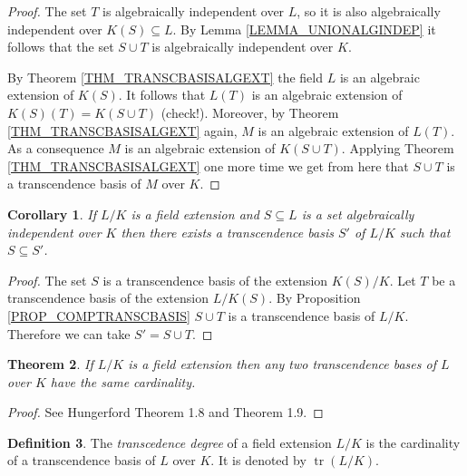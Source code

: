 \documentclass[12pt, letterpaper, oneside]{article}
\theoremstyle{plain}
\newtheorem{theorem}{Theorem}[section]
\newtheorem{corollary}[theorem]{Corollary}
\theoremstyle{definition}
\newtheorem{definition}[theorem]{Definition}
\newcommand{\tr}{\operatorname{tr}}
\newcommand{\vs}{\vskip 5mm}
\begin{document}
\vs

\begin{proof}
The set  $T$ is algebraically independent over $L$, so it is also algebraically independent 
over $K(S)\subseteq L$. By Lemma \ref{LEMMA_UNIONALGINDEP} it follows that 
the set $S\cup T$ is algebraically independent over $K$. 

By Theorem \ref{THM_TRANSCBASISALGEXT} the field $L$ is an algebraic 
extension of $K(S)$.  It follows that $L(T)$ is an algebraic extension of 
$K(S)(T) = K(S\cup T)$ (check!).  Moreover, by Theorem \ref{THM_TRANSCBASISALGEXT} 
again,  $M$ is an algebraic extension of $L(T)$. As a consequence 
$M$ is an algebraic extension of $K(S\cup T)$.  Applying Theorem 
\ref{THM_TRANSCBASISALGEXT} one more time we get from here that $S\cup T$
is a transcendence basis of $M$ over $K$. 
\end{proof}

\vs\vs


\begin{corollary}
If $L/K$ is a field extension and $S\subseteq L$ is a set algebraically independent over 
$K$ then there exists a transcendence basis $S'$ of $L/K$ such that $S\subseteq S'$.  
\end{corollary}

\begin{proof}
The set $S$ is a transcendence basis of the extension $K(S)/K$.  Let $T$ be a transcendence 
basis of the extension $L/K(S)$. By Proposition  \ref{PROP_COMPTRANSCBASIS} 
$S\cup T$ is a transcendence  basis of $L/K$. Therefore we can take $S'= S\cup T$. 
\end{proof}

\vs\vs

\begin{theorem}
If  $L/K$ is a field extension then any two transcendence bases of $L$ over $K$ 
have the same  cardinality. 
\end{theorem}

\vs

\begin{proof}
See Hungerford Theorem 1.8 and Theorem 1.9. 
\end{proof}


\vs\vs

\begin{definition}
The \emph{transcedence degree} of  a field extension $L/K$  is  the cardinality 
of a transcendence basis of $L$ over $K$. It is denoted by $\tr(L/K)$. 
\end{definition}
\end{document}
